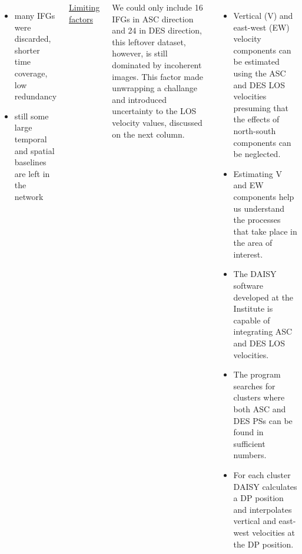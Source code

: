 \documentclass[18pt, a0paper, landscape]{tikzposter}
\begin{document}
\begin{columns}
{        \vspace{25pt}

        \begin{itemize}
            \item many IFGs were discarded, shorter time coverage, low
            redundancy
            \item still some large temporal and spatial baselines are left
            in the network
        \end{itemize}

        \vspace{10pt}

        \begin{flushleft}
            {\Large \color{blue} \underline{Limiting factors}}
        \end{flushleft}

        We could only include 16 IFGs in ASC direction and 24 in DES
        direction, this leftover dataset, however, is still dominated by
        incoherent images. This factor made unwrapping a challange and
        introduced uncertainty to the LOS velocity values, discussed on the
        next column.

    }


    {
        \begin{itemize}
            \item Vertical (V) and east-west (EW) velocity components can be
            estimated using the ASC and DES LOS velocities presuming that the
            effects of north-south components can be neglected.
            \item Estimating V and EW components help us understand
            the processes that take place in the area of interest.
            \item The DAISY software developed at the Institute is capable of
            integrating ASC and DES LOS velocities.
            \item The program searches for clusters where both ASC and DES PSs
            can be found in sufficient numbers.
            \item For each cluster DAISY calculates a DP position and
            interpolates vertical and east-west velocities at the DP
            position.
        \end{itemize}

        \vspace{25pt}

}
\end{columns}
\end{document}
